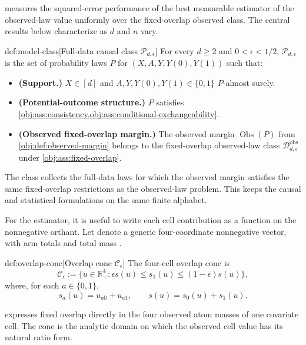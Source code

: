  measures the squared-error performance of the best measurable estimator of the observed-law value uniformly over the fixed-overlap observed class. The central results below characterize  as \(d\) and \(n\) vary.

\begin{definitionv}{def:model-class}[Full-data causal class \(\mathcal P_{d,\epsilon}\)]
For every \(d\geq 2\) and \(0<\epsilon<1/2\), \(\mathcal P_{d,\epsilon}\) is the set of probability laws \(P\) for \((X,A,Y,Y(0),Y(1))\) such that:
\begin{itemize}
\item \textbf{(Support.)} \(X\in[d]\) and \(A,Y,Y(0),Y(1)\in\{0,1\}\) \(P\)-almost surely.
\item \textbf{(Potential-outcome structure.)} \(P\) satisfies \cref{obj:ass:consistency,obj:ass:conditional-exchangeability}.
\item \textbf{(Observed fixed-overlap margin.)} The observed margin \(\operatorname{Obs}(P)\) from \cref{obj:def:observed-margin} belongs to the fixed-overlap observed-law class \(\mathcal D_{d,\epsilon}^{\mathrm{obs}}\) under \cref{obj:ass:fixed-overlap}.
\end{itemize}
\end{definitionv}

The class  collects the full-data laws for which the observed margin satisfies the same fixed-overlap restrictions as the observed-law problem. This keeps the causal and statistical formulations on the same finite alphabet.

For the estimator, it is useful to write each cell contribution as a function on the nonnegative orthant. Let  denote a generic four-coordinate nonnegative vector, with arm totals  and total mass .

\begin{definitionv}{def:overlap-cone}[Overlap cone \(\mathcal C_\epsilon\)]
The four-cell overlap cone is
\[
\mathcal C_\epsilon
:=
\{u\in\mathbb R_+^4:\epsilon s(u)\leq s_1(u)\leq(1-\epsilon)s(u)\},
\]
where, for each \(a\in\{0,1\}\),
\[
s_a(u)=u_{a0}+u_{a1},
\qquad
s(u)=s_0(u)+s_1(u).
\]
\end{definitionv}

 expresses fixed overlap directly in the four observed atom masses of one covariate cell. The cone  is the analytic domain on which the observed cell value has its natural ratio form.

